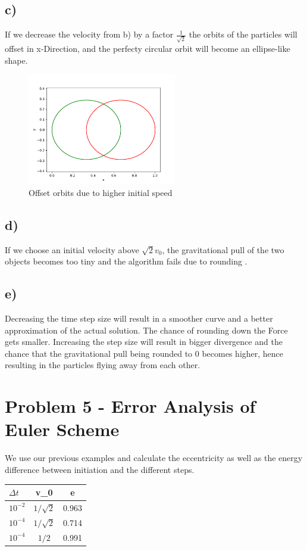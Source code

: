 \documentclass{article}
\begin{document}
\subsection*{c)} 

If we decrease the velocity from b) by a factor \( \frac{1}{\sqrt{2}} \) the 
orbits of the particles will offset in x-Direction, and the perfecty circular
orbit will become an ellipse-like shape.
\begin{figure}[ht]
    \centering
    \includegraphics[width=6.5cm]{kreisoffset.pdf} 
    \caption{Offset orbits due to higher initial speed} 
\end{figure}

\subsection*{d)}
If we choose an initial velocity above \( \sqrt{2} v _{0} \), the gravitational
pull of the two objects becomes too tiny and the algorithm fails due to rounding
.

\subsection*{e)} 
Decreasing the time step size will result in a smoother curve and a better
approximation of the actual solution. The chance of rounding down the Force
gets smaller. Increasing the step size will result in bigger divergence and
the chance that the gravitational pull being rounded to 0 becomes higher, hence
resulting in the particles flying away from each other.

\section*{Problem 5 - Error Analysis of Euler Scheme}

We use our previous examples and calculate the eccentricity as well as the 
energy difference between initiation and the different steps.

\begin{table}[ht]
    \centering
    \begin{tabular}{lcc}
	\toprule 
	\( \Delta t \) & v\_0 & e \\ \midrule 
	\( 10 ^{-2} \) & \( 1/ \sqrt{2} \) & 0.963 \\
	\( 10 ^{-4} \) & \( 1/ \sqrt{2} \) & 0.714 \\
	\( 10 ^{-4} \) & \( 1/2 \) & 0.991 \\
    \bottomrule 
\end{tabular}
\end{table}
\end{document}
